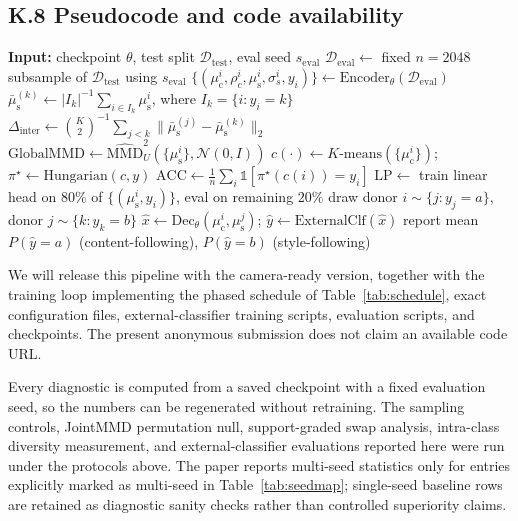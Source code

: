\documentclass[letterpaper]{article} %
\newcommand{\muc}{\mu_{\mathrm{c}}}
\newcommand{\mus}{\mu_{\mathrm{s}}}
\newcommand{\MMD}{\mathrm{MMD}}
\newcommand{\Dinter}{\Delta_{\mathrm{inter}}}
\begin{document}
\subsection{K.8 Pseudocode and code availability}

\begin{algorithm}[h]
\caption{Leakage diagnostic pipeline (evaluation-only, from a saved checkpoint)}
\begin{algorithmic}[1]
\State \textbf{Input:} checkpoint $\theta$, test split $\mathcal D_{\mathrm{test}}$, eval seed $s_{\mathrm{eval}}$
\State $\mathcal D_{\mathrm{eval}}\gets$ fixed $n{=}2048$ subsample of $\mathcal D_{\mathrm{test}}$ using $s_{\mathrm{eval}}$
\State $\{(\muc^i,\rho_c^i,\mus^i,\sigma_s^i,y_i)\}\gets \mathrm{Encoder}_\theta(\mathcal D_{\mathrm{eval}})$
  \State $\bar\mus^{(k)}\gets |I_k|^{-1}\sum_{i\in I_k}\mus^i$, where $I_k=\{i:y_i=k\}$
\EndFor
\State $\Dinter\gets\binom{K}{2}^{-1}\sum_{j<k}\|\bar\mus^{(j)}-\bar\mus^{(k)}\|_2$ 
\State $\mathrm{GlobalMMD}\gets\widehat{\MMD}^2_U(\{\mus^i\},\mathcal N(0,I))$
\State $c(\cdot)\gets K\text{-means}(\{\muc^i\})$; $\pi^\star\gets\mathrm{Hungarian}(c,y)$ 
\State $\mathrm{ACC}\gets \frac1n\sum_i\mathbb 1[\pi^\star(c(i)){=}y_i]$
\State $\mathrm{LP}\gets$ train linear head on $80\%$ of $\{(\mus^i,y_i)\}$, eval on remaining $20\%$
    \State draw donor $i\sim\{j:y_j{=}a\}$, donor $j\sim\{k:y_k{=}b\}$
    \State $\hat x\gets \mathrm{Dec}_\theta(\muc^i,\mus^j)$; $\hat y\gets \mathrm{ExternalClf}(\hat x)$ 
  \EndFor
\EndFor
\State report mean $P(\hat y{=}a)$ (content-following), $P(\hat y{=}b)$ (style-following)
\end{algorithmic}
\end{algorithm}

We will release this pipeline with the camera-ready version, together with
the training loop implementing the phased schedule of
Table~\ref{tab:schedule}, exact configuration files, external-classifier
training scripts, evaluation scripts, and checkpoints. The present anonymous
submission does not claim an available code URL.

Every diagnostic is computed from a saved checkpoint with a fixed evaluation
seed, so the numbers can be regenerated without retraining. The sampling
controls, JointMMD permutation null, support-graded swap analysis,
intra-class diversity measurement, and external-classifier evaluations
reported here were run under the protocols above. The paper reports
multi-seed statistics only for entries explicitly marked as multi-seed in
Table~\ref{tab:seedmap}; single-seed baseline rows are retained as diagnostic
sanity checks rather than controlled superiority claims.


\end{document}
